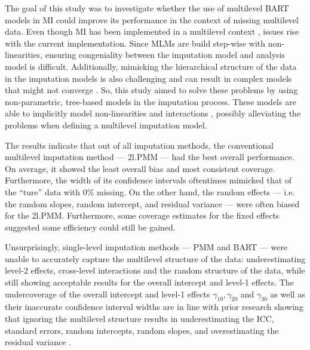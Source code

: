 \documentclass[preprint,12pt]{elsarticle}
\begin{document}
The goal of this study was to investigate whether the use of multilevel BART models in MI could improve its performance in the context of missing multilevel data. Even though MI has been implemented in a multilevel context \citep{mistlerComparisonJointModel2017, enders2018, enders2018a, enders2020, buurenFlexibleImputationMissing2018, taljaard2008, enders2016, resche-rigon2018, audigier2018, dong2023, grund2016, grund2018a, grund2018, ludtke2017, grund2021, quartagno2022}, issues rise with the current implementation. Since MLMs are build step-wise with non-linearities, ensuring congeniality between the imputation model and analysis model is difficult. Additionally, mimicking the hierarchical structure of the data in the imputation models is also challenging \citep{buurenFlexibleImputationMissing2018, burgette2010, hox2011} and can result in complex models that might not converge \citep{buurenFlexibleImputationMissing2018}. So, this study aimed to solve these problems by using non-parametric, tree-based models in the imputation process. These models are able to implicitly model non-linearities and interactions \citep{hill2020, burgette2010, lin2019, chipman2010, james2021, salditt2023, breiman1984}, possibly alleviating the problems when defining a multilevel imputation model. 

The results indicate that out of all imputation methods, the conventional multilevel imputation method --- 2l.PMM --- had the best overall performance. On average, it showed the least overall bias and most consistent coverage. Furthermore, the width of its confidence intervals oftentimes mimicked that of the ``ture'' data with 0\% missing. On the other hand, the random effects --- i.e. the random slopes, random intercept, and residual variance --- were often biased for the 2l.PMM. Furthermore, some coverage estimates for the fixed effects suggested some efficiency could still be gained. %

Unsurprisingly, single-level imputation methods --- PMM and BART --- were unable to accurately capture the multilevel structure of the data: underestimating level-2 effects, cross-level interactions and the random structure of the data, while still showing acceptable results for the overall intercept and level-1 effects. The undercoverage of the overall intercept and level-1 effects $\gamma_{10}, \gamma_{20}$ and $\gamma_{30}$ as well as their inaccurate confidence interval widths are in line with prior research showing that ignoring the multilevel structure results in underestimating the ICC, standard errors, random intercepts, random slopes, and overestimating the residual variance \citep{buurenFlexibleImputationMissing2018, ludtke2017, taljaard2008, hox2011,enders2016}.
\end{document}
